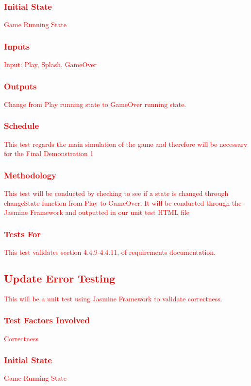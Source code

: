 \documentclass[11pt, oneside]{article}   	%
\begin{document}
\subsubsection{\textcolor{red}{Initial State}}
\textcolor{red}{Game Running State}
\subsubsection{\textcolor{red}{Inputs}}
\textcolor{red}{Input: Play, Splash, GameOver}
\subsubsection{\textcolor{red}{Outputs}}
\textcolor{red}{Change from Play running state to GameOver running state. }
\subsubsection{\textcolor{red}{Schedule}}
\textcolor{red}{This test regards the main simulation of the game and therefore will be necessary for the Final Demonstration 1}
\subsubsection{\textcolor{red}{Methodology}}
\textcolor{red}{This test will be conducted by checking to see if a state is changed through changeState function from Play to GameOver. It will be conducted through the Jasmine Framework and outputted in our unit test HTML file}
\subsubsection{\textcolor{red}{Tests For}}
\textcolor{red}{This test validates section 4.4.9-4.4.11, of requirements documentation.}


\subsection{\textcolor{red}{Update Error Testing}}
\textcolor{red}{This will be a unit test using Jasmine Framework to validate correctness.}
\subsubsection{\textcolor{red}{Test Factors Involved}}
\textcolor{red}{Correctness}
\subsubsection{\textcolor{red}{Initial State}}
\textcolor{red}{Game Running State}
\end{document}
